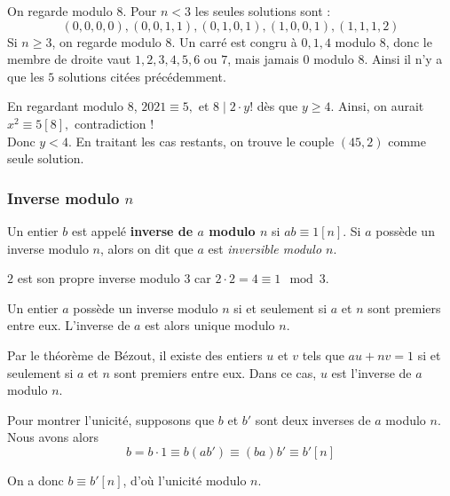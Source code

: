 \begin{sol}
On regarde modulo $8$. Pour $n<3$ les seules solutions sont :
$$(0,0,0,0),(0,0,1,1),(0,1,0,1),(1,0,0,1),(1,1,1,2)$$
Si $n\ge 3$, on regarde modulo $8$. Un carré est congru à $0,1,4$ modulo $8$, donc le membre de droite vaut $1,2,3,4,5,6$ ou $7$, mais jamais $0$ modulo $8$. Ainsi il n'y a que les $5$ solutions citées précédemment.
\end{sol}


\begin{sol}
En regardant modulo $8$, $2021\equiv 5,$ et $8\mid 2\cdot y!$ dès que $y\ge 4.$ Ainsi, on aurait $x^2\equiv 5[8],$ contradiction !\\
Donc $y<4$. En traitant les cas restants, on trouve le couple $(45,2)$ comme seule solution.
\end{sol}


\subsubsection{Inverse modulo $n$}


\begin{dfn}
Un entier $b$ est appelé \textbf{inverse de $a$ modulo $n$} si $ab \equiv 1 [n]$. Si $a$ possède un inverse modulo $n$, alors on dit que $a$ est \textit{inversible modulo $n$}.
\end{dfn}


\begin{ex}
$2$ est son propre inverse modulo $3$ car $2 \cdot 2 = 4 \equiv 1 \mod 3$.
\end{ex}

\begin{pro}
Un entier $a$ possède un inverse modulo $n$ si et seulement si $a$ et $n$ sont premiers entre eux. L'inverse de $a$ est alors unique modulo $n$.
\end{pro}

\begin{preuve}
Par le théorème de Bézout, il existe des entiers $u$ et $v$ tels que $au + nv = 1$ si et seulement si $a$ et $n$ sont premiers entre eux. Dans ce cas, $u$ est l'inverse de $a$ modulo $n$.

Pour montrer l'unicité, supposons que $b$ et $b'$ sont deux inverses de $a$ modulo $n$. Nous avons alors
$$b=b\cdot 1\equiv b(ab')\equiv (ba)b'\equiv b'[n]$$

On a donc $b\equiv b'[n]$, d’où l’unicité modulo $n$.
\end{preuve}